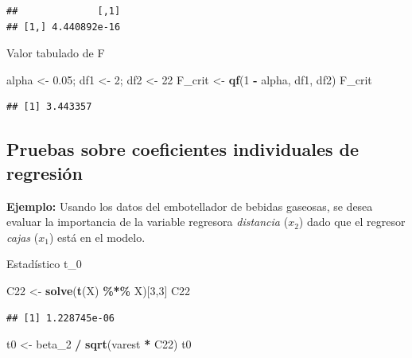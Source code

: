 \documentclass[
]{book}
\newenvironment{Shaded}{\begin{snugshade}}{\end{snugshade}}
\newcommand{\DecValTok}[1]{\textcolor[rgb]{0.00,0.00,0.81}{#1}}
\newcommand{\FloatTok}[1]{\textcolor[rgb]{0.00,0.00,0.81}{#1}}
\newcommand{\FunctionTok}[1]{\textcolor[rgb]{0.13,0.29,0.53}{\textbf{#1}}}
\newcommand{\NormalTok}[1]{#1}
\newcommand{\OtherTok}[1]{\textcolor[rgb]{0.56,0.35,0.01}{#1}}
\newcommand{\SpecialCharTok}[1]{\textcolor[rgb]{0.81,0.36,0.00}{\textbf{#1}}}
\begin{document}
\begin{verbatim}
##              [,1]
## [1,] 4.440892e-16
\end{verbatim}

Valor tabulado de F

\begin{Shaded}
\begin{Highlighting}[]
\NormalTok{alpha }\OtherTok{\textless{}{-}} \FloatTok{0.05}\NormalTok{; df1 }\OtherTok{\textless{}{-}} \DecValTok{2}\NormalTok{; df2 }\OtherTok{\textless{}{-}} \DecValTok{22}
\NormalTok{F\_crit }\OtherTok{\textless{}{-}} \FunctionTok{qf}\NormalTok{(}\DecValTok{1} \SpecialCharTok{{-}}\NormalTok{ alpha, df1, df2)}
\NormalTok{F\_crit}
\end{Highlighting}
\end{Shaded}

\begin{verbatim}
## [1] 3.443357
\end{verbatim}

\subsection{Pruebas sobre coeficientes individuales de regresión}\label{pruebas-sobre-coeficientes-individuales-de-regresiuxf3n}

\textbf{Ejemplo:} Usando los datos del embotellador de bebidas gaseosas, se desea evaluar la importancia de la variable regresora \emph{distancia} (\(x_2\)) dado que el regresor \emph{cajas} (\(x_1\)) está en el modelo.

Estadístico t\_0

\begin{Shaded}
\begin{Highlighting}[]
\NormalTok{C22 }\OtherTok{\textless{}{-}} \FunctionTok{solve}\NormalTok{(}\FunctionTok{t}\NormalTok{(X) }\SpecialCharTok{\%*\%}\NormalTok{ X)[}\DecValTok{3}\NormalTok{,}\DecValTok{3}\NormalTok{]}
\NormalTok{C22}
\end{Highlighting}
\end{Shaded}

\begin{verbatim}
## [1] 1.228745e-06
\end{verbatim}

\begin{Shaded}
\begin{Highlighting}[]
\NormalTok{t0 }\OtherTok{\textless{}{-}}\NormalTok{ beta\_2 }\SpecialCharTok{/} \FunctionTok{sqrt}\NormalTok{(varest }\SpecialCharTok{*}\NormalTok{ C22)}
\NormalTok{t0}
\end{Highlighting}
\end{Shaded}
\end{document}
